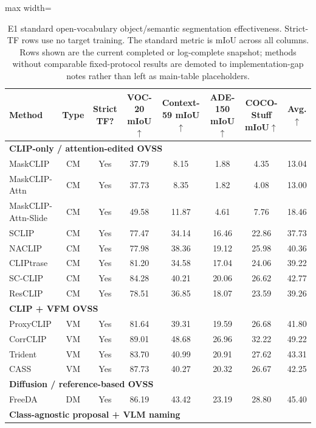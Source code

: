 \documentclass[11pt,a4paper]{article}
\newcommand{\up}{\ensuremath{\uparrow}}
\begin{document}
\begin{table}[H]
\centering
\scriptsize
\caption{E1 standard open-vocabulary object/semantic segmentation effectiveness. Strict-TF rows use no target training. The standard metric is mIoU across all columns. Rows shown are the current completed or log-complete snapshot; methods without comparable fixed-protocol results are demoted to implementation-gap notes rather than left as main-table placeholders.}
\label{tab:e1-effectiveness}
\setlength{\tabcolsep}{3pt}
\begin{adjustbox}{max width=\textwidth}
\begin{tabular}{l c c c c c c c}
\toprule
Method & Type & Strict TF? & VOC-20 mIoU\up & Context-59 mIoU\up & ADE-150 mIoU\up & COCO-Stuff mIoU\up & Avg.\up \\
\midrule
\multicolumn{8}{l}{\textbf{CLIP-only / attention-edited OVSS}} \\
MaskCLIP & CM & Yes & 37.79 & 8.15 & 1.88 & 4.35 & 13.04 \\
MaskCLIP-Attn & CM & Yes & 37.73 & 8.35 & 1.82 & 4.08 & 13.00 \\
MaskCLIP-Attn-Slide & CM & Yes & 49.58 & 11.87 & 4.61 & 7.76 & 18.46 \\
SCLIP & CM & Yes & 77.47 & 34.14 & 16.46 & 22.86 & 37.73 \\
NACLIP & CM & Yes & 77.98 & 38.36 & 19.12 & 25.98 & 40.36 \\
CLIPtrase & CM & Yes & 81.20 & 34.58 & 17.04 & 24.06 & 39.22 \\
SC-CLIP & CM & Yes & 84.28 & 40.21 & 20.06 & 26.62 & 42.77 \\
ResCLIP & CM & Yes & 78.51 & 36.85 & 18.07 & 23.59 & 39.26 \\
\midrule
\multicolumn{8}{l}{\textbf{CLIP + VFM OVSS}} \\
ProxyCLIP & VM & Yes & 81.64 & 39.31 & 19.59 & 26.68 & 41.80 \\
CorrCLIP & VM & Yes & 89.01 & 48.68 & 26.96 & 32.22 & 49.22 \\
Trident & VM & Yes & 83.70 & 40.99 & 20.91 & 27.62 & 43.31 \\
CASS & VM & Yes & 87.73 & 40.27 & 20.32 & 26.67 & 42.25 \\
\midrule
\multicolumn{8}{l}{\textbf{Diffusion / reference-based OVSS}} \\
FreeDA & DM & Yes & 86.19 & 43.42 & 23.19 & 28.80 & 45.40 \\
\midrule
\multicolumn{8}{l}{\textbf{Class-agnostic proposal + VLM naming}} \\

\end{tabular}
\end{adjustbox}
\end{table}
\end{document}
